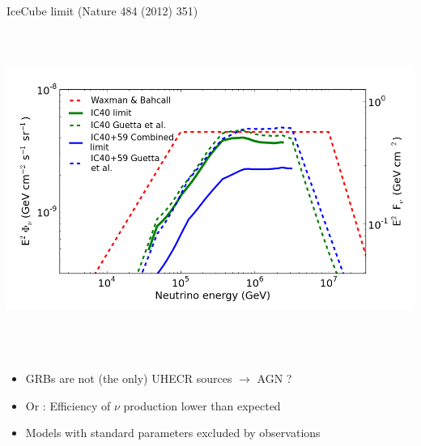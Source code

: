 \Tr
\onecolumn
\begin{center}
{\blue IceCube limit (Nature 484 (2012) 351)}\\
\includegraphics[keepaspectratio,height=11cm]{ic59+40-grb-limit2}
\end{center}
%
\begin{itemize}
\item GRBs are not (the only) UHECR sources $\rightarrow$ AGN ?
\item[] {\blue Or :} Efficiency of $\nu$ production lower than expected
\item Models with standard parameters excluded by observations
\end{itemize}
